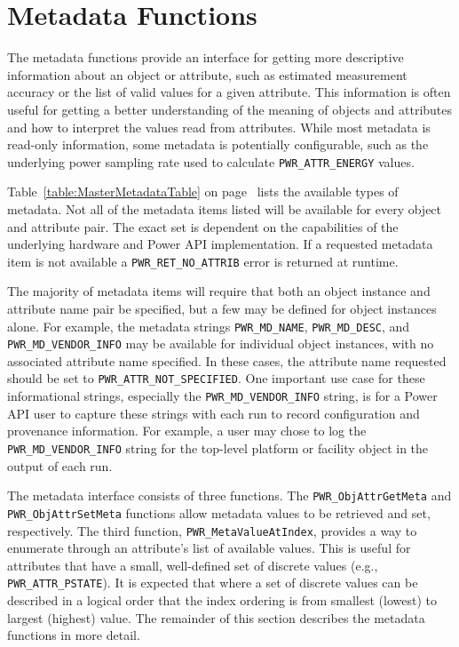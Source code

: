 \section{Metadata Functions}\label{sec:METADATA}

The metadata functions provide an interface for getting more descriptive
information about an object or attribute, such as estimated measurement
accuracy or the list of valid values for a given attribute.  This
information is often useful for getting a better understanding of the
meaning of objects and attributes and how to interpret the values read
from attributes.  While most metadata is read-only information, some
metadata is potentially configurable, such as the underlying power
sampling rate used to calculate \texttt{PWR_ATTR_ENERGY} values.

Table~\ref{table:MasterMetadataTable} on page~\pageref{type:AttrStat} 
lists the available types of metadata. Not all of the metadata items
listed will be available for every object and attribute pair.  The exact
set is dependent on the capabilities of the underlying hardware and
Power API implementation. If a requested metadata item is not available
a \texttt{PWR_RET_NO_ATTRIB} error is returned at runtime.

The majority
of metadata items will require that both an object instance and
attribute name pair be specified, but a few may be defined for object
instances alone.  For example, the metadata strings \texttt{PWR\_MD\_NAME},
\texttt{PWR\_MD\_DESC}, and \texttt{PWR\_MD\_VENDOR\_INFO} may be
available for individual object instances, with no associated attribute
name specified.  In these cases, the attribute name requested should
be set to \texttt{PWR_ATTR_NOT_SPECIFIED}. One important use case for
these informational strings, especially the \texttt{PWR\_MD\_VENDOR\_INFO}
string, is for a Power API user to capture these strings with each run
to record configuration and provenance information.  For example, a
user may chose to log the \texttt{PWR\_MD\_VENDOR\_INFO} string for
the top-level platform or facility object in the output of each run.

The metadata interface consists of three functions. The
\texttt{PWR_ObjAttrGetMeta} and \texttt{PWR_ObjAttrSetMeta} functions allow
metadata values to be retrieved and set, respectively. The third function,
\texttt{PWR_MetaValueAtIndex}, provides a way to enumerate through an attribute's
list of available values.  This is useful for attributes that have a small, well-defined
set of discrete values (e.g., \texttt{PWR\_ATTR\_PSTATE}). It is expected that where 
a set of discrete values can be described in a logical order that the index ordering
is from smallest (lowest) to largest (highest) value. The remainder of
this section describes the metadata functions in more detail.

